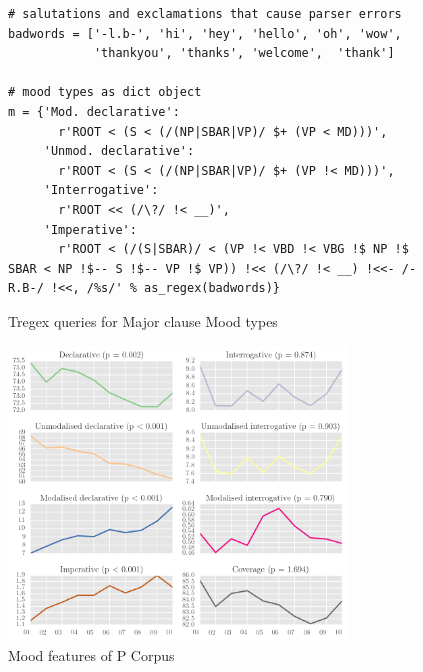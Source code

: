 
\begin{figure}[htb]
\centering
\begin{verbatim}
# salutations and exclamations that cause parser errors
badwords = ['-l.b-', 'hi', 'hey', 'hello', 'oh', 'wow',
            'thankyou', 'thanks', 'welcome',  'thank']

# mood types as dict object
m = {'Mod. declarative':
       r'ROOT < (S < (/(NP|SBAR|VP)/ $+ (VP < MD)))',
     'Unmod. declarative':
       r'ROOT < (S < (/(NP|SBAR|VP)/ $+ (VP !< MD)))',
     'Interrogative':
       r'ROOT << (/\?/ !< __)',
     'Imperative':
       r'ROOT < (/(S|SBAR)/ < (VP !< VBD !< VBG !$ NP !$ SBAR < NP !$-- S !$-- VP !$ VP)) !<< (/\?/ !< __) !<<- /-R.B-/ !<<, /%s/' % as_regex(badwords)}
\end{verbatim}
\caption{Tregex queries for Major clause Mood types}
\label{fig:mood_dict}
\end{figure}

\begin{figure}[htb]
\centering
\includegraphics[width=0.8\textwidth]{../images/known-mood-and-indicative-types-in-p-corpus.png}
\caption{Mood features of P Corpus}
\label{fig:mood_types_P}
\end{figure}
